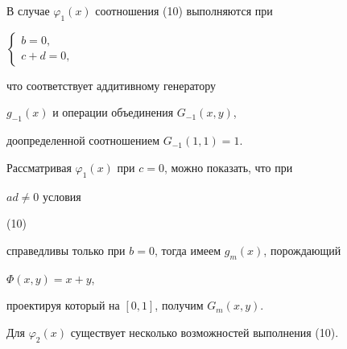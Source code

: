 В случае $\varphi_1(x)$ соотношения (10) выполняются при


$


\begin{cases}


b=0,\\


c+d=0,


\end{cases}


$


что соответствует аддитивному генератору


$g_{-1}(x)$ и операции объединения $G_{-1}(x,y)$,


доопределенной соотношением $G_{-1}(1,1)=1$.





Рассматривая $\varphi_1(x)$ при $c=0$, можно показать, что при


$ad\ne 0$ условия


(10)


справедливы только при $b=0$, тогда имеем $g_m(x)$, порождающий


$\Phi(x,y)=x+y$,


проектируя который на $[0,1]$, получим $G_m(x,y)$.





Для $\varphi_2(x)$ существует несколько возможностей выполнения (10).


